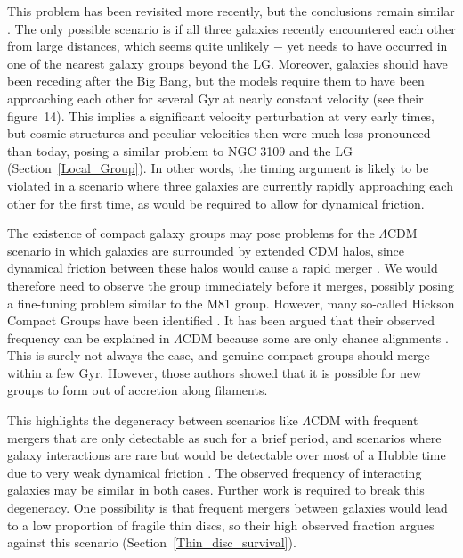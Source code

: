 \documentclass[fleqn,usenatbib,useAMS]{mnras} %
\begin{document}
This problem has been revisited more recently, but the conclusions remain similar \citep*{Oehm_2017}. The only possible scenario is if all three galaxies recently encountered each other from large distances, which seems quite unlikely $-$ yet needs to have occurred in one of the nearest galaxy groups beyond the LG. Moreover, galaxies should have been receding after the Big Bang, but the models require them to have been approaching each other for several Gyr at nearly constant velocity (see their figure~14). This implies a significant velocity perturbation at very early times, but cosmic structures and peculiar velocities then were much less pronounced than today, posing a similar problem to NGC 3109 and the LG (Section~\ref{Local_Group}). In other words, the timing argument is likely to be violated in a scenario where three galaxies are currently rapidly approaching each other for the first time, as would be required to allow for dynamical friction.

The existence of compact galaxy groups may pose problems for the $\Lambda$CDM scenario in which galaxies are surrounded by extended CDM halos, since dynamical friction between these halos would cause a rapid merger \citep{Privon_2013, Kroupa_2015}. We would therefore need to observe the group immediately before it merges, possibly posing a fine-tuning problem similar to the M81 group. However, many so-called Hickson Compact Groups have been identified \citep{Hickson_1982, Sohn_2015, Sohn_2016}. It has been argued that their observed frequency can be explained in $\Lambda$CDM because some are only chance alignments \citep{Hartsuiker_2020}. This is surely not always the case, and genuine compact groups should merge within a few Gyr. However, those authors showed that it is possible for new groups to form out of accretion along filaments.

This highlights the degeneracy between scenarios like $\Lambda$CDM with frequent mergers that are only detectable as such for a brief period, and scenarios where galaxy interactions are rare but would be detectable over most of a Hubble time due to very weak dynamical friction \citep{Renaud_2016}. The observed frequency of interacting galaxies may be similar in both cases. Further work is required to break this degeneracy. One possibility is that frequent mergers between galaxies would lead to a low proportion of fragile thin discs, so their high observed fraction argues against this scenario (Section~\ref{Thin_disc_survival}).
\end{document}
